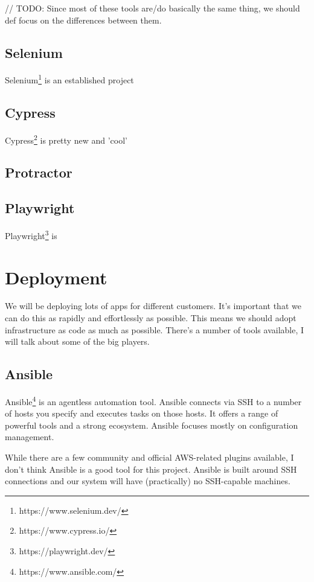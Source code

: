 // TODO: Since most of these tools are/do basically the same thing, we should def focus on the differences between them.

\subsection{Selenium}

Selenium\footnote{https://www.selenium.dev/} is an established project

\subsection{Cypress}

Cypress\footnote{https://www.cypress.io/} is pretty new and 'cool' 

\subsection{Protractor}

\subsection{Playwright}

Playwright\footnote{https://playwright.dev/} is


\section{Deployment}

We will be deploying lots of apps for different customers. It's important that we can do this as rapidly and effortlessly as possible.
This means we should adopt infrastructure as code as much as possible. There's a number of tools available, I will talk about some of the big players.

\subsection{Ansible}

Ansible\footnote{https://www.ansible.com/} is an agentless automation tool. Ansible connects via SSH to a number of hosts you specify and executes tasks on those hosts. 
It offers a range of powerful tools and a strong ecosystem. Ansible focuses mostly on configuration management.

While there are a few community and official AWS-related plugins available, I don't think Ansible is a good tool for this project. 
Ansible is built around SSH connections and our system will have (practically) no SSH-capable machines.

